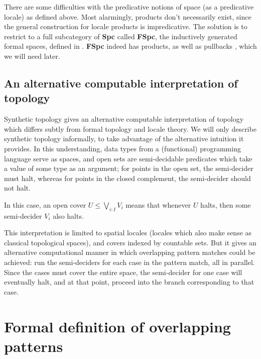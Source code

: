 \documentclass[conference]{IEEEtran}
\begin{document}
There are some difficulties with the predicative notions of space (as a predicative locale) as defined above. Most alarmingly, products don't necessarily exist, since the general construction for locale products is impredicative. The solution is to restrict to a full subcategory of \textbf{Spc} called \textbf{FSpc}, the inductively generated formal spaces, defined in \cite{coquand2003}. \textbf{FSpc} indeed has products, as well as pullbacks \cite{palmgren2003}, which we will need later.

\subsection{An alternative computable interpretation of topology}

Synthetic topology \cite{escardo2004, lesnik} gives an alternative computable interpretation of topology which differs subtly from formal topology and locale theory. We will only describe synthetic topology informally, to take advantage of the alternative intuition it provides. In this understanding, data types from a (functional) programming language serve as spaces, and open sets are semi-decidable predicates which take a value of some type as an argument; for points in the open set, the semi-decider must halt, whereas for points in the closed complement, the semi-decider should not halt.

In this case, an open cover $U \le \bigvee_{i : I} V_i$ means that whenever $U$ halts, then some semi-decider $V_i$ also halts.

This interpretation is limited to spatial locales (locales which also make sense as classical topological spaces), and covers indexed by countable sets. But it gives an alternative computational manner in which overlapping pattern matches could be achieved: run the semi-deciders for each case in the pattern match, all in parallel. Since the cases must cover the entire space, the semi-decider for one case will eventually halt, and at that point, proceed into the branch corresponding to that case.

\section{Formal definition of overlapping patterns}
\end{document}
